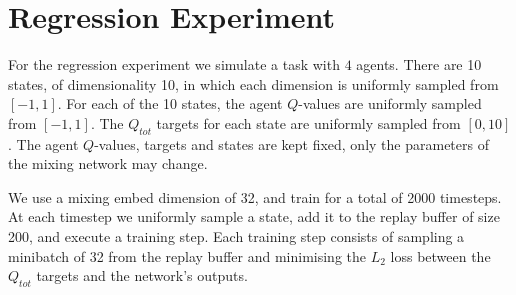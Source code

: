 \documentclass[twoside,11pt]{article}
\begin{document}
 \section{Regression Experiment}
\label{sec:regression_exp}

For the regression experiment we simulate a task with $4$ agents.
There are 10 states, of dimensionality 10, in which each dimension is uniformly sampled from $[-1,1]$.
For each of the 10 states, the agent $Q$-values are uniformly sampled from $[-1,1]$.
The $Q_{tot}$ targets for each state are uniformly sampled from $[0,10]$.
The agent $Q$-values, targets and states are kept fixed, only the parameters of the mixing network may change.

We use a mixing embed dimension of 32, and train for a total of 2000 timesteps.
At each timestep we uniformly sample a state, add it to the replay buffer of size 200, and execute a training step.
Each training step consists of sampling a minibatch of 32 from the replay buffer and minimising the $L_2$ loss between the $Q_{tot}$ targets and the network's outputs. 
\end{document}
